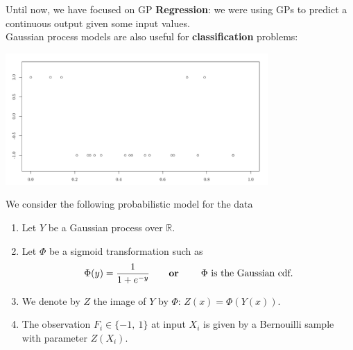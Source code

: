 \documentclass{beamer}
\begin{document}
\begin{frame}{}
Until now, we have focused on GP \textbf{Regression}: we were using GPs to predict a continuous output given some input values.\\
\vspace{5mm} 
Gaussian process models are also useful for \textbf{classification} problems:
\begin{center}
 \includegraphics[height=5cm]{figures/R/classif_data.pdf}
\end{center}
\end{frame}

\begin{frame}{}
We consider the following probabilistic model for the data
\begin{enumerate}
 	\item Let $Y$ be a Gaussian process over $\mathds{R}$.
 	\item Let $\Phi$ be a sigmoid transformation such as
 	$$ \Phi(y) = \frac{1}{1+e^{-y}} \text{\qquad \textbf{or} \qquad $\Phi$ is the Gaussian cdf.}$$ 
 	\item We denote by $Z$ the image of $Y$ by $\Phi$: $Z(x) = \Phi(Y(x))$.
 	\item The observation $F_i \in \{-1,\ 1\}$ at input $X_i$ is given by a Bernouilli sample with parameter $Z(X_i)$.
 \end{enumerate}
\end{frame}
\end{document}
